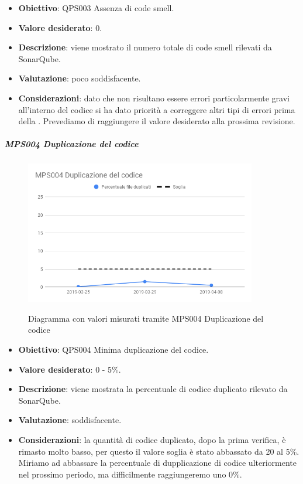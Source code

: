 	\begin{itemize}
		\item \textbf{Obiettivo}: QPS003 Assenza di code smell.
		\item \textbf{Valore desiderato}: 0.
		\item \textbf{Descrizione}: viene mostrato il numero totale di code smell rilevati da SonarQube.
		\item \textbf{Valutazione}: poco soddisfacente.
		\item \textbf{Considerazioni}: dato che non risultano essere errori particolarmente gravi all'interno del codice si ha dato priorità a correggere altri tipi di errori prima della \RQ. Prevediamo di raggiungere il valore
		desiderato alla prossima revisione.
	\end{itemize}
	
	\subparagraph{MPS004 Duplicazione del codice}
	
	\begin{figure}[H]
		\centering
		\includegraphics[width=0.9\textwidth]{img/cruscotti/RQ/MPS004.png}
		\label{immaginePresenzaDupplicazioneCodiceRQ}
		\caption{Diagramma con valori misurati tramite MPS004 Duplicazione del codice}
	\end{figure}
	
	\begin{itemize}
		\item \textbf{Obiettivo}: QPS004 Minima duplicazione del codice.
		\item \textbf{Valore desiderato}: 0 - 5\%.
		\item \textbf{Descrizione}: viene mostrata la percentuale di codice duplicato rilevato da SonarQube.
		\item \textbf{Valutazione}: soddisfacente.
		\item \textbf{Considerazioni}: la quantità di codice duplicato, dopo la prima verifica, è rimasto molto basso, per questo il valore soglia è stato abbassato da 20 al 5\%. Miriamo ad abbassare la percentuale di dupplicazione di codice ulteriormente nel prossimo periodo, ma difficilmente raggiungeremo uno 0\%.
	\end{itemize}


